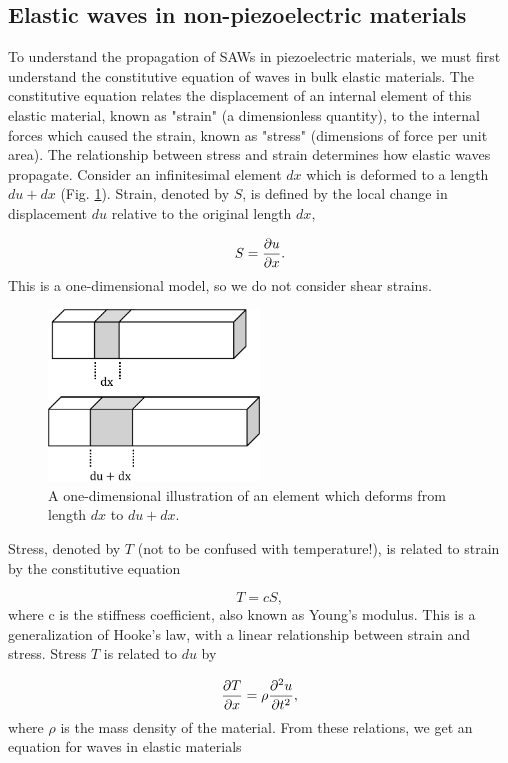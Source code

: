 \documentclass[double,12pt,1in]{beavtex}
\begin{document}
\subsection{Elastic waves in non-piezoelectric materials}
To understand the propagation of SAWs in piezoelectric materials, we must first understand the constitutive equation of waves in bulk elastic materials. The constitutive equation relates the displacement of an internal element of this elastic material, known as "strain" (a dimensionless quantity), to the internal forces which caused the strain, known as "stress" (dimensions of force per unit area). The relationship between stress and strain determines how elastic waves propagate. Consider an infinitesimal element $dx$ which is deformed to a length $du + dx$ (Fig. \ref{dfield}). Strain, denoted by $S$, is defined by the local change in displacement $du$ relative to the original length $dx$, 

\begin{equation}
    S = \pdv{u}{x}. \label{strain-displacement equation}
\end{equation}
This is a one-dimensional model, so we do not consider shear strains.
\begin{figure}
    \includegraphics[width = 0.5\textwidth]{displacement field.pdf}
    \caption{A one-dimensional illustration of an element which deforms from length $dx$ to $du + dx$.} \label{dfield}
\end{figure}
Stress, denoted by $T$ (not to be confused with temperature!), is related to strain by the constitutive equation

\begin{equation}
    T = cS, \label{elastic Hooke's}
\end{equation}
where c is the stiffness coefficient, also known as Young's modulus. This is a generalization of Hooke's law, with a linear relationship between strain and stress. Stress $T$ is related to $du$ by 

\begin{equation}
    \pdv{T}{x} = \rho \pdv[2]{u}{t}, \label{stress related to displacement}
\end{equation}
where $\rho$ is the mass density of the material. From these relations, we get an equation for waves in elastic materials
\end{document}
